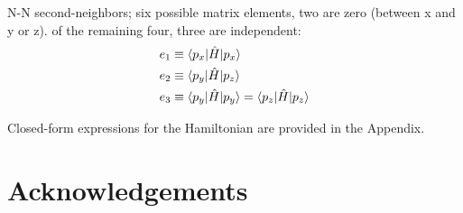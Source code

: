 \documentclass[twocolumn,showpacs,preprintnumbers,superscriptaddress,prb,floatfix,aps,10pt]{revtex4-1}
\newcommand*{\ham}{\hat{H}}
\begin{document}
N-N second-neighbors; six possible matrix elements, two are zero (between x and y or z). of the remaining four, three are independent:
%
\begin{align}
\begin{split}
e_1 & \equiv \braket{p_{x}|\ham|p_{x}} \\
e_2 & \equiv \braket{p_{y}|\ham|p_{z}} \\
e_3 & \equiv \braket{p_{y}|\ham|p_{y}} = \braket{p_{z}|\ham|p_{z}} \\
\end{split}
\end{align}

Closed-form expressions for the Hamiltonian are provided in the Appendix.

\section{Acknowledgements}


\clearpage
\appendix
\end{document}
